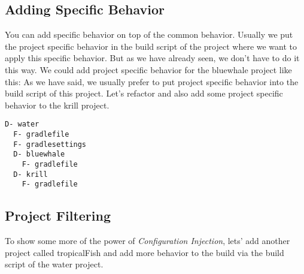 \subsection{Adding Specific Behavior} %
\label{sub:adding_specific_behavior}
You can add specific behavior on top of the common behavior. Usually we put the project specific behavior in the build script of the project where we want to apply this specific behavior. But as we have already seen, we don't have to do it this way. We could add project specific behavior for the bluewhale project like this:
As we have said, we usually prefer to put project specific behavior into the build script of this project. Let's refactor and also add some project specific behavior to the krill project.

\begin{minipage}[t]{7cm}
\begin{Verbatim}[frame=single,label=Project Tree]
D- water
  F- gradlefile
  F- gradlesettings
  D- bluewhale
    F- gradlefile
  D- krill
    F- gradlefile	
\end{Verbatim}
\end{minipage}	
\begin{minipage}[t]{9cm}
\end{minipage}

\subsection{Project Filtering} %
\label{sub:project_filtering}
To show some more of the power of \emph{Configuration Injection}, lets' add another project called tropicalFish and add more behavior to the build via the build script of the water project.

